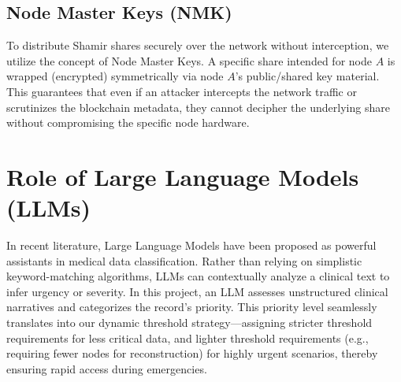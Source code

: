 \subsection{Node Master Keys (NMK)}
To distribute Shamir shares securely over the network without interception, we utilize the concept of Node Master Keys. A specific share intended for node $A$ is wrapped (encrypted) symmetrically via node $A$'s public/shared key material. This guarantees that even if an attacker intercepts the network traffic or scrutinizes the blockchain metadata, they cannot decipher the underlying share without compromising the specific node hardware.

\section{Role of Large Language Models (LLMs)}
In recent literature, Large Language Models have been proposed as powerful assistants in medical data classification. Rather than relying on simplistic keyword-matching algorithms, LLMs can contextually analyze a clinical text to infer urgency or severity. In this project, an LLM assesses unstructured clinical narratives and categorizes the record's priority. This priority level seamlessly translates into our dynamic threshold strategy—assigning stricter threshold requirements for less critical data, and lighter threshold requirements (e.g., requiring fewer nodes for reconstruction) for highly urgent scenarios, thereby ensuring rapid access during emergencies.
